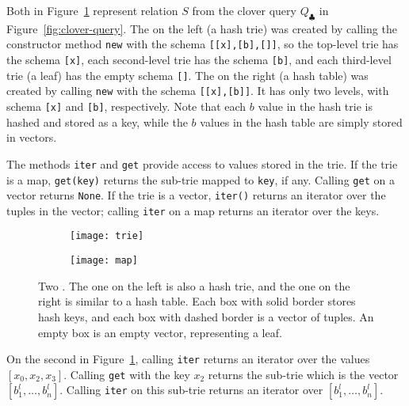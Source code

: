 \begin{ex}
  Both \GHTs in Figure~\ref{fig:ght-examples} represent relation $S$ from the
  clover query $Q_\clubsuit$ in Figure~\ref{fig:clover-query}.  The
  \GHT on the left (a hash trie) was created by calling the
  constructor method \lstinline|new| with the schema
  \lstinline|[[x],[b],[]]|, so the top-level trie has the schema
  \lstinline|[x]|, each second-level trie has the schema
  \lstinline|[b]|, and each third-level trie (a leaf) has the empty
  schema \lstinline|[]|.  The \GHT on the right (a hash table) was
  created by calling \lstinline|new| with the schema
  \lstinline|[[x],[b]]|.  It has only two levels, with schema
  \lstinline|[x]| and \lstinline|[b]|, respectively.  Note that each
  $b$ value in the hash trie is hashed and stored as a key, while the
  $b$ values in the hash table are simply stored in vectors.
\end{ex}

The methods \lstinline|iter| and \lstinline|get| 
  provide access to values stored in the trie.
If the trie is a map, 
  \lstinline|get(key)| returns the sub-trie mapped to \lstinline|key|,
  if any.
Calling \texttt{get} on a vector returns \lstinline|None|.
If the trie is a vector, 
  \lstinline|iter()|
  returns an iterator over the tuples in the vector;
  calling \texttt{iter} on a map 
  returns an iterator over the keys.

\begin{figure}
  \centering
  \begin{subfigure}[c]{0.3\linewidth}
  \texttt{[image: trie]}
  \end{subfigure}\hspace{1.5cm}%
  \begin{subfigure}[c]{0.3\linewidth}
  \texttt{[image: map]}
  \end{subfigure} 
  \caption{
    Two \GHTs. The one on the left is also a hash trie, 
      and the one on the right is similar to a hash table.
    Each box with solid border stores hash keys, 
    and each box with dashed border is a vector of tuples.
    An empty box is an empty vector, representing a leaf.
  }
  \label{fig:ght-examples}
\end{figure}

\begin{ex}
  On the second \GHT in Figure~\ref{fig:ght-examples},
    calling \texttt{iter} returns an 
    iterator over the values $[x_0, x_2, x_3]$.
    Calling \texttt{get} with the key $x_2$ 
    returns the sub-trie which is the vector $[b_1^l, \ldots, b_n^l]$.
  Calling \texttt{iter} on this sub-trie
    returns an iterator over $[b_1^l, \ldots, b_n^l]$.
\end{ex}


